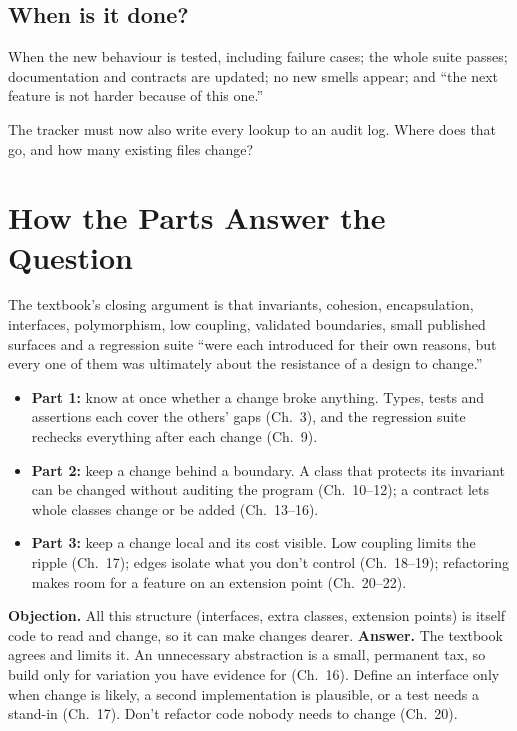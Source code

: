 \documentclass[10pt]{article}
\begin{document}
\subsection{When is it done?}
When the new behaviour is tested, including failure cases; the whole suite passes; documentation and contracts are updated; no new smells appear; and ``the next feature is not harder because of this one.''

\begin{ponder}
The tracker must now also write every lookup to an audit log. Where does that go, and how many existing files change?
\end{ponder}

\newpage
\section*{How the Parts Answer the Question}

The textbook's closing argument is that invariants, cohesion, encapsulation, interfaces, polymorphism, low coupling, validated boundaries, small published surfaces and a regression suite ``were each introduced for their own reasons, but every one of them was ultimately about the resistance of a design to change.''
\begin{itemize}
  \item \textbf{Part 1:} know at once whether a change broke anything. Types, tests and assertions each cover the others' gaps (Ch.~3), and the regression suite rechecks everything after each change (Ch.~9).
  \item \textbf{Part 2:} keep a change behind a boundary. A class that protects its invariant can be changed without auditing the program (Ch.~10--12); a contract lets whole classes change or be added (Ch.~13--16).
  \item \textbf{Part 3:} keep a change local and its cost visible. Low coupling limits the ripple (Ch.~17); edges isolate what you don't control (Ch.~18--19); refactoring makes room for a feature on an extension point (Ch.~20--22).
\end{itemize}

\textbf{Objection.} All this structure (interfaces, extra classes, extension points) is itself code to read and change, so it can make changes dearer.
\textbf{Answer.} The textbook agrees and limits it. An unnecessary abstraction is a small, permanent tax, so build only for variation you have evidence for (Ch.~16). Define an interface only when change is likely, a second implementation is plausible, or a test needs a stand-in (Ch.~17). Don't refactor code nobody needs to change (Ch.~20).
\end{document}
